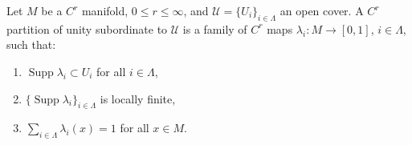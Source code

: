 Let $M$ be a $C^r$ manifold, $0 \leqslant r \leqslant \infty$, and $\mathcal{U} = \{U_i\}_{i \in \Lambda}$ an open cover. A $C^r$ partition of unity subordinate to $\mathcal{U}$ is a family of $C^r$ maps $\lambda_i: M \to [0,1]$, $i \in \Lambda$, such that:

\begin{enumerate}
\item $\operatorname{Supp} \lambda_i \subset U_i$ for all $i \in \Lambda$,
\item $\{\operatorname{Supp} \lambda_i\}_{i \in \Lambda}$ is locally finite,
\item $\sum_{i \in \Lambda} \lambda_i(x) = 1$ for all $x \in M$.
\end{enumerate}
